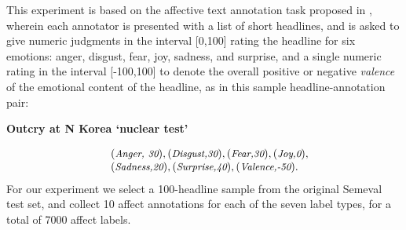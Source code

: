 \documentclass[11pt]{article}
\begin{document}
This experiment is based on the affective text annotation task proposed in , wherein each annotator is presented with a list of short headlines, and is asked to give numeric judgments in the interval [0,100] rating the headline for six emotions: anger, disgust, fear, joy, sadness, and surprise, and a single numeric rating in the interval [-100,100] to denote the overall positive or negative \textit{valence} of the emotional content of the headline, as in
this sample headline-annotation pair:
\begin{center} \textbf{Outcry at N Korea `nuclear test'} \end{center}
\begin{equation*}
\begin{array}{ll}
&\small(\textit{Anger, 30}),(\textit{Disgust,30}),(\textit{Fear,30}), (\textit{Joy,0}),\\
&\small(\textit{Sadness,20}),(\textit{Surprise,40}),(\textit{Valence,-50}).
\end{array}
\end{equation*}
For our experiment we select a 100-headline sample from the original Semeval test set, and collect 10 affect annotations for each of the seven label types, for a total of 7000 affect labels.


%
\end{document}
